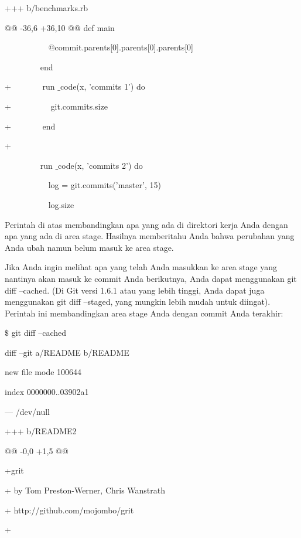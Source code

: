 +++ b/benchmarks.rb \par
\noindent 
@@ -36,6 +36,10 @@ def main \par
\noindent 
~~~~~~~~~~ @commit.parents[0].parents[0].parents[0] \par
\noindent 
~~~~~~~~ end \par
\vspace{12pt}
\noindent 
+~~~~~~~ run $  \_  $code(x, 'commits 1') do \par
\noindent 
+~~~~~~~~~ git.commits.size \par
\noindent 
+~~~~~~~ end \par
\noindent 
+ \par
\noindent 
~~~~~~~~ run $  \_  $code(x, 'commits 2') do \par
\noindent 
~~~~~~~~~~ log = git.commits('master', 15) \par
\noindent 
~~~~~~~~~~ log.size \par
\noindent 
Perintah di atas membandingkan apa yang ada di direktori kerja Anda dengan apa yang ada di area stage. Hasilnya memberitahu Anda bahwa perubahan yang Anda ubah namun belum masuk ke area stage. \par
\noindent 
Jika Anda ingin melihat apa yang telah Anda masukkan ke area stage yang nantinya akan masuk ke commit Anda berikutnya, Anda dapat menggunakan git diff --cached. (Di Git versi 1.6.1 atau yang lebih tinggi, Anda dapat juga menggunakan git diff --staged, yang mungkin lebih mudah untuk diingat). Perintah ini membandingkan area stage Anda dengan commit Anda terakhir: \par
\vspace{12pt}
\vspace{12pt}
\noindent 
 $  \$  $ git diff --cached \par
\noindent 
diff --git a/README b/README \par
\noindent 
new file mode 100644 \par
\noindent 
index 0000000..03902a1 \par
\noindent 
--- /dev/null \par
\noindent 
+++ b/README2 \par
\noindent 
@@ -0,0 +1,5 @@ \par
\noindent 
+grit \par
\noindent 
+ by Tom Preston-Werner, Chris Wanstrath \par
\noindent 
+ http://github.com/mojombo/grit \par
\noindent 
+ \par
\noindent 
